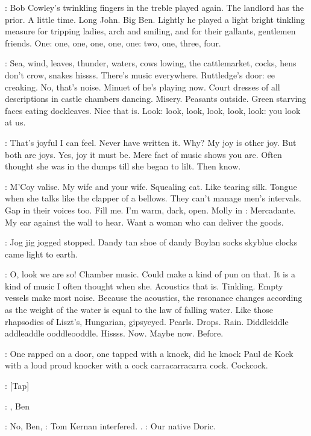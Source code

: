 :
Bob Cowley's twinkling fingers in the treble played again.
The
landlord has the prior.
A little time.
Long John.
Big Ben.
Lightly he
played a light bright tinkling measure for tripping ladies,
arch and
smiling,
and for their gallants,
gentlemen friends.
One:
one,
one,
one,
one,
one:
two,
one,
three,
four.

\BloomInt:
Sea,
wind,
leaves,
thunder,
waters,
cows lowing,
the cattlemarket,
cocks,
hens don't crow,
snakes hissss.
There's music everywhere.
Ruttledge's door:
ee creaking.
No,
that's noise.
Minuet of
he's playing now.
Court dresses of all descriptions in castle chambers
dancing.
Misery.
Peasants outside.
Green starving faces eating
dockleaves.
Nice that is.
Look:
look,
look,
look,
look,
look:
you
look at us.

\BloomInt:
That's joyful I can feel.
Never have written it.
Why?
My joy is other
joy.
But both are joys.
Yes,
joy it must be.
Mere fact of music shows you
are.
Often thought she was in the dumps till she began to lilt.
Then
know.

\BloomInt:
M'Coy valise.
My wife and your wife.
Squealing cat.
Like tearing silk.
Tongue when she talks like the clapper of a bellows.
They can't manage
men's intervals.
Gap in their voices too.
Fill me.
I'm warm,
dark,
open.
Molly in :
Mercadante.
My ear against the wall to hear.
Want
a woman who can deliver the goods.

\BloomInt:
Jog jig jogged stopped.
Dandy tan shoe of dandy Boylan socks
skyblue clocks came light to earth.

\BloomInt:
O,
look we are so!
Chamber music.
Could make a kind of pun on
that.
It is a kind of music I often thought when she.
Acoustics that is.
Tinkling.
Empty vessels make most noise.
Because the acoustics,
the
resonance changes according as the weight of the water is equal to the law
of falling water.
Like those rhapsodies of Liszt's,
Hungarian,
gipsyeyed.
Pearls.
Drops.
Rain.
Diddleiddle addleaddle ooddleooddle.
Hissss.
Now.
Maybe now.
Before.

\BloomInt:
One rapped on a door,
one tapped with a knock,
did he knock Paul
de Kock with a loud proud knocker with a cock carracarracarra cock.
Cockcock.

\stripling:
[Tap]

\cowley:
,
Ben

:
No,
Ben,
:
Tom Kernan interfered.
.
:
Our native Doric.


